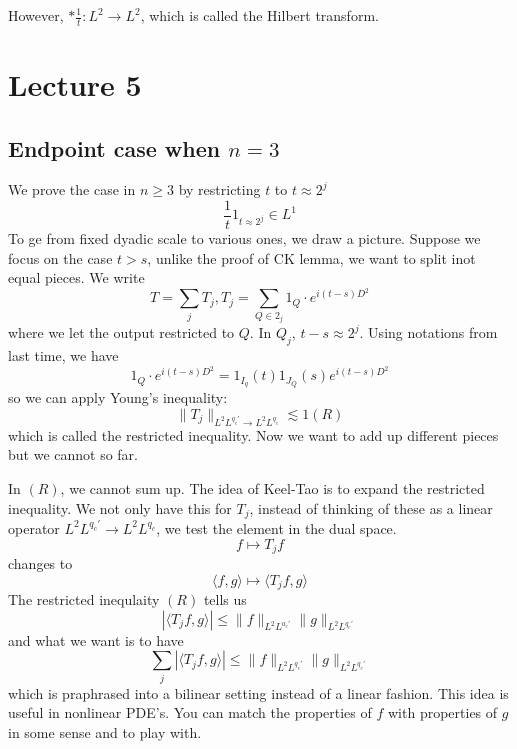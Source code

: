 However, $\ast\frac{1}{t}:L^2\to L^2$, which is called the Hilbert transform.

\section{Lecture 5}
\subsection{Endpoint case when $n=3$}
We prove the case in $n\geq 3$ by restricting $t$ to $t\approx 2^j$
\begin{equation*}
    \frac{1}{t}1_{t\approx 2^j}\in L^1
\end{equation*}
To ge from fixed dyadic scale to various ones, we draw a picture.
Suppose we focus on the case $t>s$, unlike the proof of CK lemma, we want to split inot equal pieces. We write
\begin{equation*}
    T=\sum_j T_j, T_j=\sum_{Q\in 2_j}1_Q\cdot e^{i(t-s)D^2}
\end{equation*}
where we let the output restricted to $Q$. In $Q_j$, $t-s\approx 2^j$. Using notations from last time, we have
\begin{equation*}
    1_Q\cdot e^{i(t-s)D^2}=1_{I_q}(t)1_{J_Q}(s)e^{i(t-s)D^2}
\end{equation*}
so we can apply Young's inequality:
\begin{equation*}
    \|T_j\|_{L^2L^{q_c'}\to L^2L^{q_c}}\lesssim 1(R)
\end{equation*}
which is called the restricted inequality. Now we want to add up different pieces but we cannot so far.

In $(R)$, we cannot sum up. The idea of Keel-Tao is to expand the restricted inequality. We not only have this for $T_j$, instead of thinking of these as a linear operator $L^2L^{q_c'}\to L^2L^{q_c}$, we test the element in the dual space.
\begin{equation*}
    f\mapsto T_jf
\end{equation*}
changes to
\begin{equation*}
    \langle f,g\rangle \mapsto \langle T_jf, g\rangle
\end{equation*}
The restricted inequlaity $(R)$ tells us
\begin{equation*}
    |\langle T_jf, g\rangle|\leq\|f\|_{L^2L^{a_c'}}\|g\|_{L^2L^{q_c'}}
\end{equation*}
and what we want is to have
\begin{equation*}
    \sum_j|\langle T_jf, g\rangle|\leq \|f\|_{L^2L^{q_c'}}\|g\|_{L^2L^{q_c'}}
\end{equation*}
which is praphrased into a bilinear setting instead of a linear fashion. This idea is useful in nonlinear PDE's. You can match the properties of $f$ with properties of $g$ in some sense and to play with.

